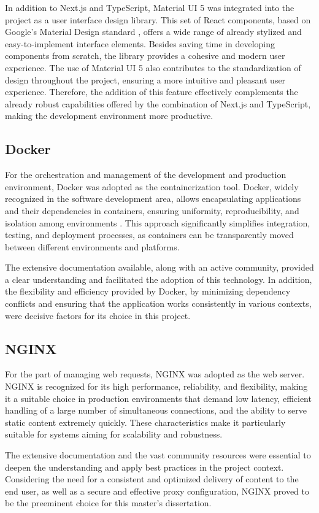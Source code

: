In addition to Next.js and TypeScript, Material UI 5 \cite{muiDocs} was integrated into the project as a user interface design library. This set of React components, based on Google's Material Design standard \cite{m3Docs}, offers a wide range of already stylized and easy-to-implement interface elements. Besides saving time in developing components from scratch, the library provides a cohesive and modern user experience. The use of Material UI 5 also contributes to the standardization of design throughout the project, ensuring a more intuitive and pleasant user experience. Therefore, the addition of this feature effectively complements the already robust capabilities offered by the combination of Next.js and TypeScript, making the development environment more productive.

\subsection{Docker}
For the orchestration and management of the development and production environment, Docker \cite{dockerDocs} was adopted as the containerization tool. Docker, widely recognized in the software development area, allows encapsulating applications and their dependencies in containers, ensuring uniformity, reproducibility, and isolation among environments \cite{dockerOverview}. This approach significantly simplifies integration, testing, and deployment processes, as containers can be transparently moved between different environments and platforms.

The extensive documentation available, along with an active community, provided a clear understanding and facilitated the adoption of this technology. In addition, the flexibility and efficiency provided by Docker, by minimizing dependency conflicts and ensuring that the application works consistently in various contexts, were decisive factors for its choice in this project.

\subsection{NGINX}
For the part of managing web requests, NGINX \cite{nginxDocs} was adopted as the web server. NGINX is recognized for its high performance, reliability, and flexibility, making it a suitable choice in production environments that demand low latency, efficient handling of a large number of simultaneous connections, and the ability to serve static content extremely quickly. These characteristics make it particularly suitable for systems aiming for scalability and robustness.

The extensive documentation and the vast community resources were essential to deepen the understanding and apply best practices in the project context. Considering the need for a consistent and optimized delivery of content to the end user, as well as a secure and effective proxy configuration, NGINX proved to be the preeminent choice for this master's dissertation.






